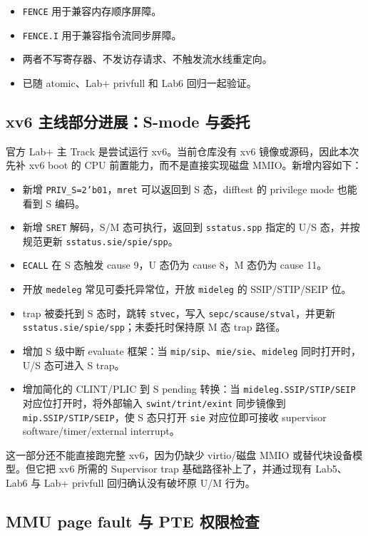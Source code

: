 \documentclass[UTF8,a4paper,11pt]{ctexart}
\begin{document}
\begin{itemize}
  \item \texttt{FENCE} 用于兼容内存顺序屏障。
  \item \texttt{FENCE.I} 用于兼容指令流同步屏障。
  \item 两者不写寄存器、不发访存请求、不触发流水线重定向。
  \item 已随 atomic、Lab+ privfull 和 Lab6 回归一起验证。
\end{itemize}

\subsection{xv6 主线部分进展：S-mode 与委托}

官方 Lab+ 主 Track 是尝试运行 xv6。当前仓库没有 xv6 镜像或源码，因此本次先补 xv6 boot 的 CPU 前置能力，而不是直接实现磁盘 MMIO。新增内容如下：

\begin{itemize}
  \item 新增 \texttt{PRIV\_S=2'b01}，\texttt{mret} 可以返回到 S 态，difftest 的 privilege mode 也能看到 S 编码。
  \item 新增 \texttt{SRET} 解码，S/M 态可执行，返回到 \texttt{sstatus.spp} 指定的 U/S 态，并按规范更新 \texttt{sstatus.sie/spie/spp}。
  \item \texttt{ECALL} 在 S 态触发 cause 9，U 态仍为 cause 8，M 态仍为 cause 11。
  \item 开放 \texttt{medeleg} 常见可委托异常位，开放 \texttt{mideleg} 的 SSIP/STIP/SEIP 位。
  \item trap 被委托到 S 态时，跳转 \texttt{stvec}，写入 \texttt{sepc/scause/stval}，并更新 \texttt{sstatus.sie/spie/spp}；未委托时保持原 M 态 trap 路径。
  \item 增加 S 级中断 evaluate 框架：当 \texttt{mip/sip}、\texttt{mie/sie}、\texttt{mideleg} 同时打开时，U/S 态可进入 S trap。
  \item 增加简化的 CLINT/PLIC 到 S pending 转换：当 \texttt{mideleg.SSIP/STIP/SEIP} 对应位打开时，将外部输入 \texttt{swint/trint/exint} 同步镜像到 \texttt{mip.SSIP/STIP/SEIP}，使 S 态只打开 \texttt{sie} 对应位即可接收 supervisor software/timer/external interrupt。
\end{itemize}

这一部分还不能直接跑完整 xv6，因为仍缺少 virtio/磁盘 MMIO 或替代块设备模型。但它把 xv6 所需的 Supervisor trap 基础路径补上了，并通过现有 Lab5、Lab6 与 Lab+ privfull 回归确认没有破坏原 U/M 行为。

\subsection{MMU page fault 与 PTE 权限检查}
\end{document}
